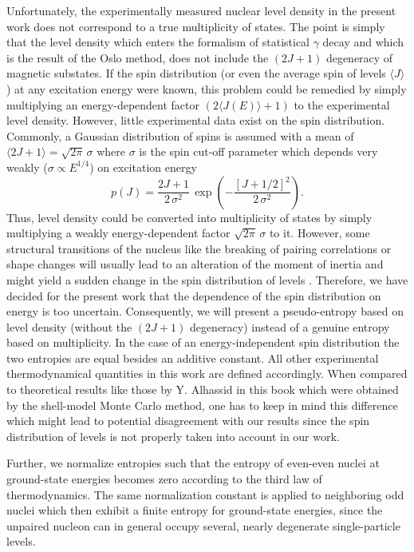 \documentclass[sort&compress,final,numberedheadings]{aipproc}
\begin{document}
Unfortunately, the experimentally measured nuclear level density in the present
work does not correspond to a true multiplicity of states. The point is simply
that the level density which enters the formalism of statistical $\gamma$ decay
and which is the result of the Oslo method, does not include the $(2J+1)$ 
degeneracy of magnetic substates. If the spin distribution (or even the average
spin of levels $\langle J\rangle$) at any excitation energy were known, this 
problem could be remedied by simply multiplying an energy-dependent factor
$(2\langle J(E)\rangle+1)$ to the experimental level density. However, little
experimental data exist on the spin distribution. Commonly, a Gaussian 
distribution of spins is assumed with a mean of 
$\langle 2J+1\rangle=\sqrt{2\pi}\,\sigma$ where $\sigma$ is the spin cut-off 
parameter which depends very weakly ($\sigma\propto E^{1/4}$) on excitation 
energy \cite{Be36+GC65}
\begin{equation}
p(J)=\frac{2J+1}{2\,\sigma^2}\,\exp\left(-\frac{\left[J+1/2\right]^2}
{2\,\sigma^2}\right).
\end{equation}
Thus, level density could be converted into multiplicity of states by simply
multiplying a weakly energy-dependent factor $\sqrt{2\pi}\,\sigma$ to it. 
However, some structural transitions of the nucleus like the breaking of 
pairing correlations or shape changes will usually lead to an alteration of the
moment of inertia and might yield a sudden change in the spin distribution of 
levels \cite{JR71}. Therefore, we have decided for the present work that the 
dependence of the spin distribution on energy is too uncertain. Consequently, 
we will present a pseudo-entropy based on level density (without the $(2J+1)$ 
degeneracy) instead of a genuine entropy based on multiplicity. In the case of 
an energy-independent spin distribution the two entropies are equal besides an 
additive constant. All other experimental thermodynamical quantities in this 
work are defined accordingly. When compared to theoretical results like those 
by Y. Alhassid in this book which were obtained by the shell-model Monte Carlo 
method, one has to keep in mind this difference which might lead to potential 
disagreement with our results since the spin distribution of levels is not 
properly taken into account in our work. 

Further, we normalize entropies such that the entropy of even-even nuclei at
ground-state energies becomes zero according to the third law of 
thermodynamics. The same normalization constant is applied to neighboring odd
nuclei which then exhibit a finite entropy for ground-state energies, since the
unpaired nucleon can in general occupy several, nearly degenerate 
single-particle levels.
\end{document}
